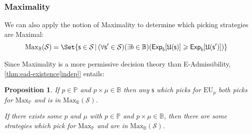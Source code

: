 \documentclass[a4paper,final]{article}
\newtheorem{proposition}[theorem]{Proposition}
\renewcommand\P{\mathbb{P}} %
\newcommand\Exp{\mathsf{Exp}}
\newcommand\EU{\mathrm{EU}}
\newcommand\EAd{\mathrm{EAd}}
\newcommand\U{\mathfrak{U}} %
\newcommand\Maximality{\mathrm{Max}}
\renewcommand\S{\mathcal{S}}
\newcommand\s{\mathsf{s}}
\newcommand{\IB}{\mathbb{B}}
\newcommand{\IP}{\P}
\renewcommand{\color}[1]{}
\newenvironment{colored}[1]{\leavevmode\color{#1}}{}
\newcommand{\Strategies}{\S}
\newcommand\SetDelimiter[1][]{
	\nonscript\,#1\vert \allowbreak \nonscript\,\mathopen{}}
\providecommand\given{\SetDelimiter}
\renewcommand{\geq}{\geqslant}
\newenvironment{CCM rewritten}
{\begingroup\color{blue}} %
{\endgroup}              %
\begin{document}
	\subsubsection{Maximality}
	We can also apply the notion of Maximality to determine which picking strategies are Maximal: 
	$$\Maximality_\IB(\S)=\Set{\s\in\S\given (\forall \s'\in\S)(\exists b\in\IB)(\Exp_b[\U(\s)]\geq\Exp_b[\U(\s')])}$$
	
Since Maximality is a more permissive decision theory than E-Admissibility, \cref{thm:ead-existence[indep]} entails:


%	

	 \begin{proposition}\label{thm:max-suff}
	If $p\in\IP$ and $p\times\mu\in\IB$ then any $\s$ which picks for $\EU_p$ both picks for $\Maximality_\IP$ and is in $\Maximality_\IB(\S)$. 
	
	If there exists some $p$ and $\mu$ with $p\in\IP$ and $p\times\mu\in\IB$, then there are some strategies which pick for $\Maximality_\IP$ and are in $\Maximality_\IB(\S)$. 
\end{proposition}

\end{document}
